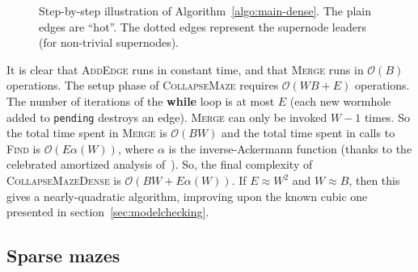 \documentclass[a4paper,UKenglish,cleveref, autoref]{lipics-v2021}
\newcommand{\bigO}[1]{\ensuremath{\mathcal{O}\left( #1 \right)} }
\begin{document}
\begin{figure}
\begin{center}
\end{center}

\caption{Step-by-step illustration of Algorithm~\ref{algo:main-dense}. The plain
  edges are ``hot''. The dotted edges represent the supernode leaders (for
  non-trivial supernodes). \label{fig:step-by-step}}
\end{figure}

It is clear that \textsc{AddEdge} runs in constant time, and that \textsc{Merge}
runs in $\bigO{B}$ operations.  The setup phase of \textsc{CollapseMaze}
requires $\bigO{WB + E}$ operations. The number of iterations of the
\textbf{while} loop is at most $E$ (each new wormhole added to \texttt{pending}
destroys an edge). \textsc{Merge} can only be invoked $W-1$ times. So the total
time spent in \textsc{Merge} is $\bigO{BW}$ and the total time spent in calls to
\textsc{Find} is $\bigO{E \alpha(W)}$, where $\alpha$ is the inverse-Ackermann
function (thanks to the celebrated amortized analysis
of~\cite{10.1145/62.2160}). %
So, the final complexity of \textsc{CollapseMazeDense} is
$\bigO{BW + E \alpha(W)}$. If $E \approx W^2$ and $W \approx B$, then this gives
a nearly-quadratic algorithm, improving upon the known cubic one presented in
section~\ref{sec:modelchecking}.

\subsection{Sparse mazes}
\label{sec:sparse}
\end{document}
